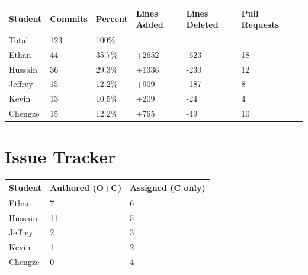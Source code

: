 \documentclass{article}
\begin{document}

\begin{table}[H]
\centering
\begin{tabular}{lllllll}
\toprule
\textbf{Student} & \textbf{Commits} & \textbf{Percent} & \textbf{Lines Added} &
\textbf{Lines Deleted} & \textbf{Pull Requests}\\
\midrule
Total & 123 & 100\% \\
Ethan & 44 & 35.7\% & +2652 & -623 & 18\\
Hussain & 36 & 29.3\% & +1336 & -230 & 12\\
Jeffrey & 15 & 12.2\% & +909 & -187 & 8\\
Kevin & 13 & 10.5\% & +209 & -24 & 4\\
Chengze & 15 & 12.2\% & +765 & -49 & 10\\
\bottomrule
\end{tabular}
\end{table}



\section{Issue Tracker}


\begin{table}[H]
\centering
\begin{tabular}{lll}
\toprule
\textbf{Student} & \textbf{Authored (O+C)} & \textbf{Assigned (C only)}\\
\midrule
Ethan & 7 & 6 \\
Hussain & 11 & 5 \\
Jeffrey & 2 & 3 \\
Kevin & 1 & 2 \\
Chengze & 0 & 4 \\
\bottomrule
\end{tabular}
\end{table}
\end{document}
